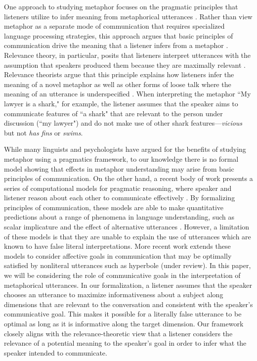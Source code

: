 \documentclass[10pt,letterpaper]{article}
\begin{document}
One approach to studying metaphor focuses on the pragmatic principles that listeners utilize to infer meaning from metaphorical utterances \cite{tendahl2008complementary}. Rather than view metaphor as a separate mode of communication that requires specialized language processing strategies, this approach argues that basic principles of communication drive the meaning that a listener infers from a metaphor \cite{sperber2008deflationary, wilson2006metaphor}. Relevance theory, in particular, posits that listeners interpret utterances with the assumption that speakers produced them because they are maximally relevant \cite{wilson2002relevance}. Relevance theorists argue that this principle explains how listeners infer the meaning of a novel metaphor as well as other forms of loose talk where the meaning of an utterance is underspecified  \cite{sperber1985loose}. When interpreting the metaphor ``My lawyer is a shark," for example, the listener assumes that the speaker aims to communicate features of  ``a shark" that are relevant to the person under discussion (``my lawyer") and do not make use of other shark features---\emph{vicious} but not \emph{has fins} or \emph{swims}.

While many linguists and psychologists have argued for the benefits of studying metaphor using a pragmatics framework, to our knowledge there is no formal model showing that effects in metaphor understanding may arise from basic principles of communication. On the other hand, a recent body of work presents a series of computational models for pragmatic reasoning, where speaker and listener reason about each other to communicate effectively \cite{frank2012predicting, jager2009pragmatic}. By formalizing principles of communication, these models are able to make quantitative predictions about a range of phenomena in language understanding, such as scalar implicature and the effect of alternative utterances \cite{goodman2013knowledge, bergen2012s}. However, a limitation of these models is that they are unable to explain the use of utterances which are known to have false literal interpretations. More recent work extends these models to consider affective goals in communication that may be optimally satisfied by nonliteral utterances such as hyperbole (under review). In this paper, we will be considering the role of communicative goals in the interpretation of metaphorical utterances. In our formalization, a listener assumes that the speaker chooses an utterance to maximize informativeness about a subject along dimensions that are relevant to the conversation and consistent with the speaker's communicative goal. This makes it possible for a literally false utterance to be optimal as long as it is informative along the target dimension. Our framework closely aligns with the relevance-theoretic view that a listener considers the relevance of a potential meaning to the speaker's goal in order to infer what the speaker intended to communicate. 
\end{document}
